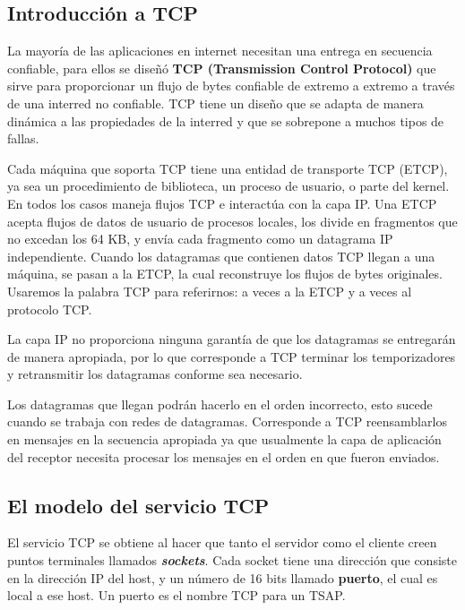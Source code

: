 \documentclass[10pt,a4paper]{report}
\begin{document}
\subsection{Introducción a TCP}
	
	\par La mayoría de las aplicaciones en internet necesitan una entrega en secuencia 
confiable, para ellos se diseñó \textbf{TCP (Transmission Control Protocol)} que sirve 
para proporcionar un flujo de bytes confiable de extremo a extremo a través de una 
interred no confiable. TCP tiene un diseño que se adapta de manera dinámica a las 
propiedades de la interred y que se sobrepone a muchos tipos de fallas.

	\par Cada máquina que soporta TCP tiene una entidad de transporte TCP (ETCP), ya 
sea un procedimiento de biblioteca, un proceso de usuario, o parte del kernel. En todos 
los casos maneja flujos TCP e interactúa con la capa IP. Una ETCP acepta flujos de 
datos de usuario de procesos locales, los divide en fragmentos que no excedan los 64 
KB, y envía cada fragmento como un datagrama IP independiente. Cuando los 
datagramas que contienen datos TCP llegan a una máquina, se pasan a la ETCP, la cual 
reconstruye los flujos de bytes originales. Usaremos la palabra TCP para referirnos: a 
veces a la ETCP y a veces al protocolo TCP.

	\par La capa IP no proporciona ninguna garantía de que los datagramas se entregarán 
de manera apropiada, por lo que corresponde a TCP terminar los temporizadores y 
retransmitir los datagramas conforme sea necesario.

	\par Los datagramas que llegan podrán hacerlo en el orden incorrecto, esto sucede 
cuando se trabaja con redes de datagramas. Corresponde a TCP reensamblarlos en 
mensajes en la secuencia apropiada ya que usualmente la capa de aplicación del 
receptor necesita procesar los mensajes en el orden en que fueron enviados.

\subsection{El modelo del servicio TCP}
	
	\par El servicio TCP se obtiene al hacer que tanto el servidor como el cliente creen 
puntos terminales llamados \textbf{\textit{sockets}}. Cada socket tiene una dirección 
que consiste en la dirección IP del host, y un número de 16 bits llamado \textbf{puerto}, el cual es local a ese host. Un puerto es el nombre TCP para un TSAP.
\end{document}
